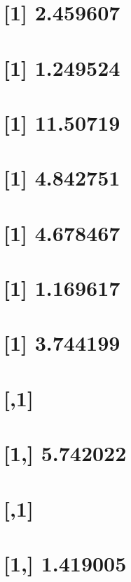 \documentclass[]{book}
\theoremstyle{definition}
\theoremstyle{definition}
\theoremstyle{definition}
\theoremstyle{remark}
\begin{document}
\section{{[}1{]} 2.459607}\label{section-52}

\section{{[}1{]} 1.249524}\label{section-53}

\section{{[}1{]} 11.50719}\label{section-54}

\section{{[}1{]} 4.842751}\label{section-55}

\section{{[}1{]} 4.678467}\label{section-56}

\section{{[}1{]} 1.169617}\label{section-57}

\section{{[}1{]} 3.744199}\label{section-58}

\section{{[},1{]}}\label{section-59}

\section{{[}1,{]} 5.742022}\label{section-60}

\section{{[},1{]}}\label{section-61}

\section{{[}1,{]} 1.419005}\label{section-62}
\end{document}
